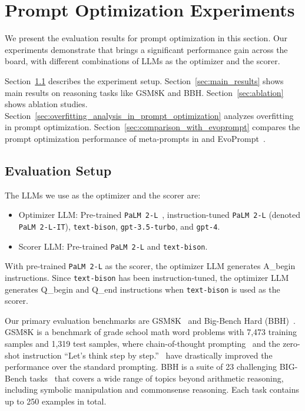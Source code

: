 \section{Prompt Optimization Experiments}
\label{sec:exp}

We present the evaluation results for prompt optimization in this section. Our experiments demonstrate that \name{} brings a significant performance gain across the board, with different combinations of LLMs as the optimizer and the scorer.


Section~\ref{sec:evaluation_setup} describes the experiment setup.
Section~\ref{sec:main_results} shows main results on reasoning tasks like GSM8K and BBH.
Section~\ref{sec:ablation} shows ablation studies. 
Section~\ref{sec:overfitting_analysis_in_prompt_optimization} analyzes overfitting in prompt optimization.
Section~\ref{sec:comparison_with_evoprompt} compares the prompt optimization performance of meta-prompts in \name{} and EvoPrompt~\citep{guo2023connecting}.

\subsection{Evaluation Setup}
\label{sec:evaluation_setup}

The LLMs we use as the optimizer and the scorer are:

\begin{itemize}[leftmargin=2em,topsep=0pt,partopsep=1ex,parsep=0ex]
\item Optimizer LLM: Pre-trained \texttt{PaLM 2-L}~\citep{anil2023palm}, instruction-tuned \texttt{PaLM 2-L} (denoted \texttt{PaLM 2-L-IT}), \texttt{text-bison}, \texttt{gpt-3.5-turbo}, and \texttt{gpt-4}.
\item Scorer LLM: Pre-trained \texttt{PaLM 2-L} and \texttt{text-bison}.
\end{itemize}

With pre-trained \texttt{PaLM 2-L} as the scorer, the optimizer LLM generates A\_begin instructions.
Since \texttt{text-bison} has been instruction-tuned, the optimizer LLM generates Q\_begin and Q\_end instructions when \texttt{text-bison} is used as the scorer.

Our primary evaluation benchmarks are GSM8K~\citep{cobbe2021training} and Big-Bench Hard (BBH)~\citep{suzgun2022challenging}. GSM8K is a benchmark of grade school math word problems with 7,473 training samples and 1,319 test samples, where chain-of-thought prompting~\citep{wei2022chain} and the zero-shot instruction ``Let's think step by step.''~\citep{kojima2022large} have drastically improved the performance over the standard prompting. BBH is a suite of 23 challenging BIG-Bench tasks~\citep{srivastava2022beyond} that covers a wide range of topics beyond arithmetic reasoning, including symbolic manipulation and commonsense reasoning. Each task contains up to 250 examples in total.

